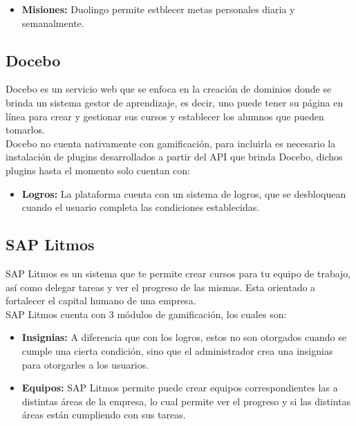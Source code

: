 \begin{multicols*}{2}
\begin{itemize}
    \item {\bf Misiones:} Duolingo permite estblecer metas personales diaria y
        semanalmente.

    \end{itemize}


\subsection*{Docebo}

 Docebo \cite{PagDocebo} es un servicio web que se enfoca en la creación de dominios donde se brinda
 un sistema gestor de aprendizaje, es decir, uno puede tener su página en línea para crear y gestionar
 sus cursos y establecer los alumnos que pueden tomarlos.\\

 \noindent Docebo no cuenta nativamente con gamificación, para incluirla es necesario la instalación
 de plugins desarrollados a partir del API que brinda Docebo, dichos plugins hasta el momento solo
 cuentan con:

    \begin{itemize}
    \item {\bf Logros:} La plataforma cuenta con un sistema de logros, que se
                        desbloquean cuando el usuario completa las condiciones
                        establecidas.
    \end{itemize}

\subsection*{SAP Litmos}

 SAP Litmos \cite{PagSAPLitmos} es un sistema que te permite crear cursos para tu equipo de trabajo,
 así como delegar tareas y ver el progreso de las mismas. Esta orientado a
 fortalecer el capital humano de una empresa.\\

    \noindent SAP Litmos cuenta con 3 módulos de gamificación, los cuales son:

    \begin{itemize}
        \item {\bf Insignias:} A diferencia que con los logros, estos
        no son otorgados cuando se cumple una cierta condición, sino
        que el administrador crea una insignias para otorgarles a los usuarios.

        \item {\bf Equipos: } SAP Litmos permite puede crear equipos
        correspondientes las a distintas áreas de la empresa, lo cual permite ver
        el progreso y si las distintas áreas están cumpliendo con sus tareas.


\end{itemize}
\end{multicols*}
